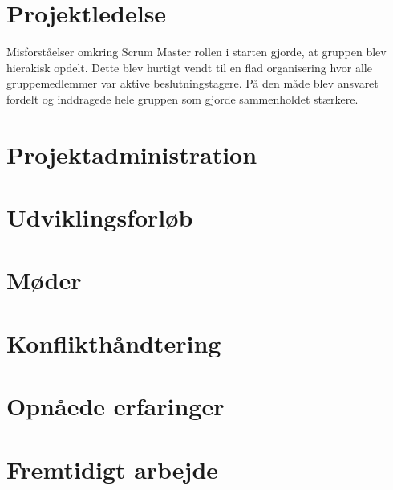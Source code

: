 \section*{Projektledelse}
Misforståelser omkring Scrum Master rollen i starten gjorde, at gruppen blev hierakisk opdelt. Dette blev hurtigt vendt til en flad organisering hvor alle gruppemedlemmer var aktive beslutningstagere. På den måde blev ansvaret fordelt og inddragede hele gruppen som gjorde sammenholdet stærkere.

\section*{Projektadministration}

\section*{Udviklingsforløb}

\section*{Møder}

\section*{Konflikthåndtering}

\section*{Opnåede erfaringer}

\section*{Fremtidigt arbejde}